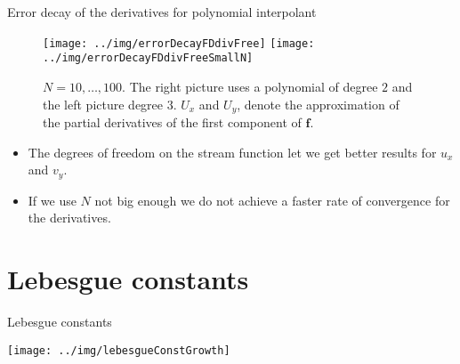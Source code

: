 \documentclass{beamer}
\begin{document}
\begin{frame}{Error decay of the derivatives for polynomial interpolant}
  \begin{figure}[htb]
    \begin{center}
      \texttt{[image: ../img/errorDecayFDdivFree]}
      \texttt{[image: ../img/errorDecayFDdivFreeSmallN]}
    \end{center}
    \caption{$N=10,\ldots,100$. The right picture uses a polynomial of degree 
      $2$ and the left picture degree $3$. $U_{x}$ and $U_{y}$, denote the 
      approximation of the partial derivatives of the first component of 
      $\mathbf{f}$.}
  \end{figure}
  
  \begin{itemize}
    \item The degrees of freedom on the stream function let we get better
      results for $u_x$ and $v_y$.
      
    \item If we use $N$ not big enough we do not achieve a faster rate of
      convergence for the derivatives.
  \end{itemize}
\end{frame}

\section{Lebesgue constants}
\begin{frame}{Lebesgue constants}
  \begin{center}
    \texttt{[image: ../img/lebesgueConstGrowth]}
  \end{center}
\end{frame}
\end{document}

